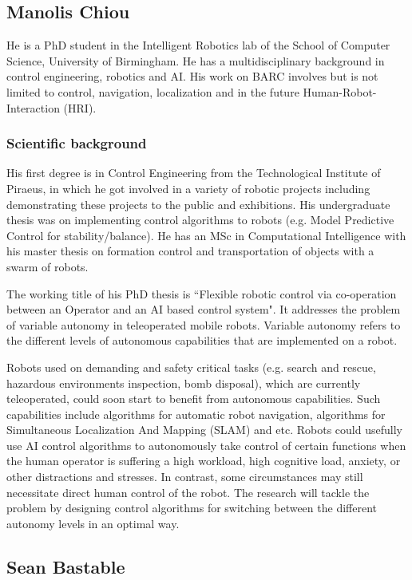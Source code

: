 \documentclass[conference]{IEEEtran}
\begin{document}
\subsection{Manolis Chiou}

He is a PhD student in the Intelligent Robotics lab of the School of Computer Science, University of Birmingham. He has a multidisciplinary background in control engineering, robotics and AI. His work on BARC involves but is not limited to control, navigation, localization and in the future Human-Robot-Interaction (HRI).

\subsubsection*{Scientific background}

His first degree is in Control Engineering from the Technological Institute of Piraeus, in which he got involved in a variety of robotic projects including demonstrating these projects to the public and exhibitions. His undergraduate thesis was on implementing control algorithms to robots (e.g. Model Predictive Control for stability/balance). He has an MSc in Computational Intelligence with his master thesis on formation control and transportation of objects with a swarm of robots.  

The working title of his PhD thesis is ``Flexible robotic control via co-operation between an Operator and an AI based control system". It addresses the problem of variable autonomy in teleoperated mobile robots. Variable autonomy refers to the different levels of autonomous capabilities that are implemented on a robot.

Robots used on demanding and safety critical tasks (e.g. search and rescue, hazardous environments inspection, bomb disposal), which are currently teleoperated, could soon start to benefit from autonomous capabilities. Such capabilities include algorithms for automatic robot navigation, algorithms for Simultaneous Localization And Mapping (SLAM) and etc. Robots could usefully use AI control algorithms to autonomously take control of certain functions when the human operator is suffering a high workload, high cognitive load, anxiety, or other distractions and stresses. In contrast, some circumstances may still necessitate direct human control of the robot. The research will tackle the problem by designing control algorithms for switching between the different autonomy levels in an optimal way. 


\subsection{Sean Bastable}
\end{document}

